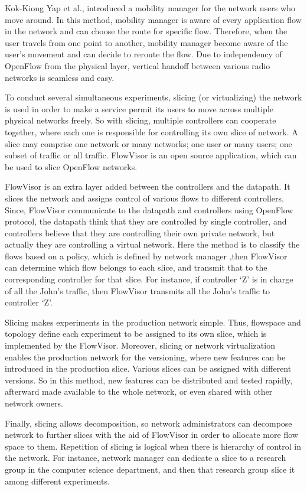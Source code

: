 \documentclass[english]{tktltiki2}
\theoremstyle{definition}
\theoremstyle{remark}
\begin{document}
Kok-Kiong Yap et al., introduced a mobility manager for the network users who move around. In this method, mobility manager is aware of every application flow in the network and can choose the route for specific flow. Therefore, when the user travels from one point to another, mobility manager become aware of the user’s movement and can decide to reroute the flow. Due to independency of OpenFlow from the physical layer, vertical handoff between various radio networks is seamless and easy. 

To conduct several simultaneous experiments, slicing (or virtualizing) the network is used in order to make a service permit its users to move across multiple physical networks freely. So with slicing, multiple controllers can cooperate together, where each one is responsible for controlling its own slice of network. A slice may comprise one network or many networks; one user or many users; one subset of traffic or all traffic. FlowVisor is an open source application, which can be used to slice OpenFlow networks. 

FlowVisor is an extra layer added between the controllers and the datapath. It slices the network and assigns control of various flows to different controllers. Since, FlowVisor communicate to the datapath and controllers using OpenFlow protocol, the datapath think that they are controlled by single controller, and controllers believe that they are controlling their own private network, but actually they are controlling a virtual network. Here the method is to classify the flows based on a policy, which is defined by network manager ,then FlowVisor can determine which flow belongs to each slice, and transmit that to the corresponding controller for that slice. For instance, if controller ‘Z’ is in charge of all the John’s traffic, then FlowVisor transmits all the John’s traffic to controller ‘Z’. 

Slicing makes experiments in the production network simple. Thus, flowspace and topology define each experiment to be assigned to its own slice, which is implemented by the FlowVisor. Moreover, slicing or network virtualization enables the production network for the versioning, where new features can be introduced in the production slice. Various slices can be assigned with different versions. So in this method, new features can be distributed and tested rapidly, afterward made available to the whole network, or even shared with other network owners. 

Finally, slicing allows decomposition, so network administrators can decompose network to further slices with the aid of FlowVisor in order to allocate more flow space to them. Repetition of slicing is logical when there is hierarchy of control in the network. For instance, network manager can dedicate a slice to a research group in the computer science department, and then that research group slice it among different experiments. 
\end{document}
